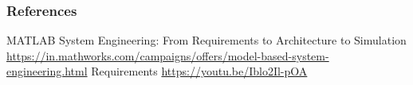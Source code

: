 


\begin{frame}
\frametitle{References}
\footnotesize{
\begin{thebibliography}{99} 
 MATLAB
\newblock System Engineering: From Requirements to Architecture to Simulation
\newblock \url{https://in.mathworks.com/campaigns/offers/model-based-system-engineering.html} 
\newblock Requirements 
\newblock  \url{https://youtu.be/Iblo2Il-pOA}
\end{thebibliography}
}
\end{frame}
